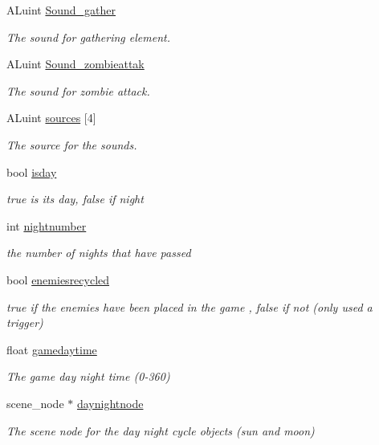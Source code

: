 \begin{DoxyCompactItemize}
A\+Luint \hyperlink{classoctet_1_1minecraft__wars_a074eafb7ecaee55ddd999c8a9c26bb62}{Sound\+\_\+gather}
\begin{DoxyCompactList}\small\item\em The sound for gathering element. \end{DoxyCompactList}\item 
A\+Luint \hyperlink{classoctet_1_1minecraft__wars_ab065d64bf9df1a96bfd62b964b0c249e}{Sound\+\_\+zombieattak}
\begin{DoxyCompactList}\small\item\em The sound for zombie attack. \end{DoxyCompactList}\item 
A\+Luint \hyperlink{classoctet_1_1minecraft__wars_a2ee223674fa2fbe1616629725a6d845e}{sources} \mbox{[}4\mbox{]}
\begin{DoxyCompactList}\small\item\em The source for the sounds. \end{DoxyCompactList}\item 
bool \hyperlink{classoctet_1_1minecraft__wars_ad53fa9489507ea201f30c4a929dd0f77}{isday}
\begin{DoxyCompactList}\small\item\em true is its day, false if night \end{DoxyCompactList}\item 
int \hyperlink{classoctet_1_1minecraft__wars_a40e43deac31fa350abac00c6bb6eab75}{nightnumber}
\begin{DoxyCompactList}\small\item\em the number of nights that have passed \end{DoxyCompactList}\item 
bool \hyperlink{classoctet_1_1minecraft__wars_a0244d8a261eaeb616479c64ad2c0aab5}{enemiesrecycled}
\begin{DoxyCompactList}\small\item\em true if the enemies have been placed in the game , false if not (only used a trigger) \end{DoxyCompactList}\item 
float \hyperlink{classoctet_1_1minecraft__wars_aff5df5d4844cc380f26eb21b28537987}{gamedaytime}
\begin{DoxyCompactList}\small\item\em The game day night time (0-\/360) \end{DoxyCompactList}\item 
scene\+\_\+node $\ast$ \hyperlink{classoctet_1_1minecraft__wars_ac658c13a9f41b84fb89156ca0cb4b9f1}{daynightnode}
\begin{DoxyCompactList}\small\item\em The scene node for the day night cycle objects (sun and moon) \end{DoxyCompactList}\end{DoxyCompactItemize}


